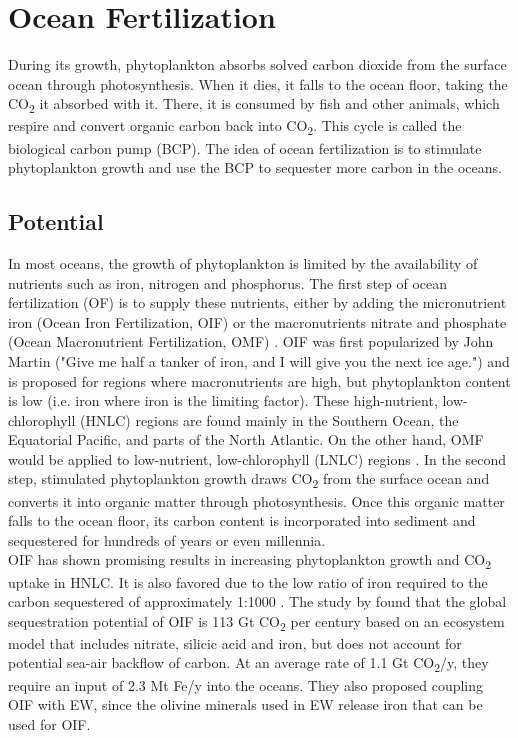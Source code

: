 \section{Ocean Fertilization}
During its growth, phytoplankton absorbs solved carbon dioxide from the surface ocean through photosynthesis. When it dies, it falls to the ocean floor, taking the CO\textsubscript{2} it absorbed with it. There, it is consumed by fish and other animals, which respire and convert organic carbon back into CO\textsubscript{2}. This cycle is called the biological carbon pump (BCP). The idea of ocean fertilization is to stimulate phytoplankton growth and use the BCP to sequester more carbon in the oceans.
\subsection*{Potential}
In most oceans, the growth of phytoplankton is limited by the availability of nutrients such as iron, nitrogen and phosphorus. The first step of ocean fertilization (OF) is to supply these nutrients, either by adding the micronutrient iron (Ocean Iron Fertilization, OIF) or the macronutrients nitrate and phosphate (Ocean Macronutrient Fertilization, OMF) \parencite[77]{NAS2022ASequestration}.
OIF was first popularized by John Martin ("Give me half a tanker of iron, and I will give you the next ice age.") and is proposed for regions where macronutrients are high, but phytoplankton content is low (i.e. iron where iron is the limiting factor). These high-nutrient, low-chlorophyll (HNLC) regions are found mainly in the Southern Ocean, the Equatorial Pacific, and parts of the North Atlantic. On the other hand, OMF would be applied to low-nutrient, low-chlorophyll (LNLC) regions \parencite{Chisholm2001Dis-CreditingFertilization}.
In the second step, stimulated phytoplankton growth draws CO\textsubscript{2} from the surface ocean and converts it into organic matter through photosynthesis. Once this organic matter falls to the ocean floor, its carbon content is incorporated into sediment and sequestered for hundreds of years or even millennia. \parencite{Fuss2018NegativeEffects, S.F.Jones2014TheNourishment}\\
OIF has shown promising results in increasing phytoplankton growth and CO\textsubscript{2} uptake in HNLC. It is also favored due to the low ratio of iron required to the carbon sequestered of approximately 1:1000 \parencite[99]{NAS2022ASequestration}.
The study by \textcite{Hauck2016IronExperiment} found that the global sequestration potential of OIF is 113 Gt CO\textsubscript{2} per century based on an ecosystem model that includes nitrate, silicic acid and iron, but does not account for potential sea-air backflow of carbon. At an average rate of 1.1 Gt CO\textsubscript{2}/y, they require an input of 2.3 Mt Fe/y into the oceans. They also proposed coupling OIF with EW, since the olivine minerals used in EW release iron that can be used for OIF.
